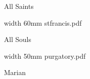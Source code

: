 \beginpart All Saints



\bigskip



\eject



\bigskip

\pdfximage width 60mm {stfrancis.pdf}

\centerline{\pdfrefximage \pdflastximage}



\eject

\beginpart All Souls



\paginaproxima


\bigskip

\pdfximage width 50mm {purgatory.pdf}

\centerline{\pdfrefximage \pdflastximage}



\eject

\beginpart Marian


\bigskip



\paginaproxima

%


%




\bigskip




\eject


\paginaproxima



\paginaproxima


\paginaproxima


